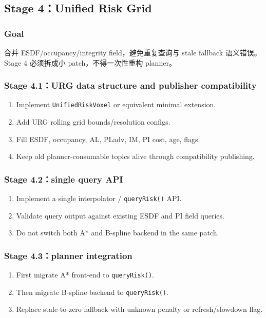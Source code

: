 \documentclass[11pt,a4paper]{article}
\begin{document}
\subsection{Stage 4：Unified Risk Grid}

\subsubsection{Goal}
合并 ESDF/occupancy/integrity field，避免重复查询与 stale fallback 语义错误。Stage 4 必须拆成小 patch，不得一次性重构 planner。

\subsubsection{Stage 4.1：URG data structure and publisher compatibility}
\begin{enumerate}
\item Implement \texttt{UnifiedRiskVoxel} or equivalent minimal extension.
\item Add URG rolling grid bounds/resolution configs.
\item Fill ESDF, occupancy, AL, PLadv, IM, PI cost, age, flags.
\item Keep old planner-consumable topics alive through compatibility publishing.
\end{enumerate}

\subsubsection{Stage 4.2：single query API}
\begin{enumerate}
\item Implement a single interpolator / \texttt{queryRisk()} API.
\item Validate query output against existing ESDF and PI field queries.
\item Do not switch both A* and B-spline backend in the same patch.
\end{enumerate}

\subsubsection{Stage 4.3：planner integration}
\begin{enumerate}
\item First migrate A* front-end to \texttt{queryRisk()}.
\item Then migrate B-spline backend to \texttt{queryRisk()}.
\item Replace stale-to-zero fallback with unknown penalty or refresh/slowdown flag.
\end{enumerate}
\end{document}
